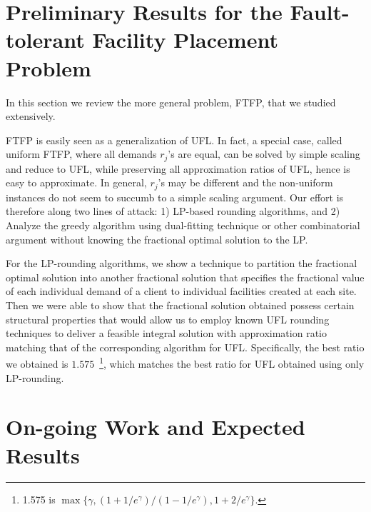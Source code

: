 \documentclass{article}[11pt]
\begin{document}
\section{Preliminary Results for the Fault-tolerant Facility Placement
  Problem}
In this section we review the more general problem, FTFP, that we
studied extensively.

FTFP is easily seen as a generalization of UFL. In fact, a special
case, called uniform FTFP, where all demands $r_j$'s are equal, can be
solved by simple scaling and reduce to UFL, while preserving all
approximation ratios of UFL, hence is easy to approximate. In general,
$r_j$'s may be different and the non-uniform instances do not seem to
succumb to a simple scaling argument. Our effort is therefore along
two lines of attack: 1) LP-based rounding algorithms, and 2) Analyze
the greedy algorithm using dual-fitting technique or other
combinatorial argument without knowing the fractional optimal solution
to the LP.

For the LP-rounding algorithms, we show a technique to partition the
fractional optimal solution into another fractional solution that
specifies the fractional value of each individual demand of a client
to individual facilities created at each site. Then we were able to
show that the fractional solution obtained possess certain structural
properties that would allow us to employ known UFL rounding techniques
to deliver a feasible integral solution with approximation ratio
matching that of the corresponding algorithm for UFL. Specifically,
the best ratio we obtained is $1.575$~\footnote{1.575 is
  $\max\{\gamma, (1+1/e^\gamma)/(1-1/e^\gamma), 1+2/e^\gamma\}$.},
which matches the best ratio for UFL obtained using only LP-rounding.

\section{On-going Work and Expected Results}
\end{document}
